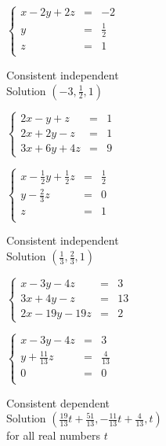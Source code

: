 \documentclass{ximera}
\begin{document}
\begin{question}
\begin{problem}
\begin{solution}
$\left\{ \begin{array}{rcr} x-2y+2z & = & -2  \\ y  & = & \frac{1}{2} \\ z & = & 1 \\  \end{array} \right.$
 

Consistent independent\\
Solution $\left(-3,\frac{1}{2},1\right)$
\end{solution}
\end{problem}

\begin{problem}
$\left\{ \begin{array}{rcr} 2x-y+z & = & 1 \\ 2x+2y-z & = & 1 \\ 3x+6y+4z & = & 9  \end{array} \right.$

\begin{solution}
$\left\{ \begin{array}{rcr} x-\frac{1}{2} y+\frac{1}{2} z & = & \frac{1}{2}  \\   y - \frac{2}{3} z & = & 0 \\ z & = & 1 \\  \end{array} \right.$
 

Consistent independent\\
Solution $\left(\frac{1}{3},\frac{2}{3},1\right)$
\end{solution}
\end{problem}

\begin{problem}
$\left\{ \begin{array}{rcr} x-3y-4z & = & 3 \\ 3x+4y-z & = & 13 \\ 2x-19y-19z & = & 2  \end{array} \right.$

\begin{solution}
$\left\{ \begin{array}{rcr} x-3y-4z & = & 3  \\ y + \frac{11}{13} z & = & \frac{4}{13} \\ 0 & = & 0 \\  \end{array} \right.$
 

Consistent dependent\\
Solution $\left(\frac{19}{13} t + \frac{51}{13},-\frac{11}{13} t+\frac{4}{13},t\right)$\\
for all real numbers $t$
\end{solution}
\end{problem}



\end{question}
\end{document}
